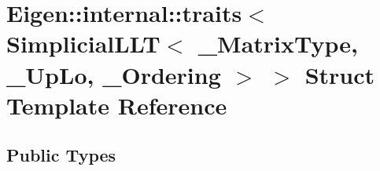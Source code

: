 \hypertarget{struct_eigen_1_1internal_1_1traits_3_01_simplicial_l_l_t_3_01___matrix_type_00_01___up_lo_00_01___ordering_01_4_01_4}{}\section{Eigen\+::internal\+::traits$<$ Simplicial\+L\+LT$<$ \+\_\+\+Matrix\+Type, \+\_\+\+Up\+Lo, \+\_\+\+Ordering $>$ $>$ Struct Template Reference}
\label{struct_eigen_1_1internal_1_1traits_3_01_simplicial_l_l_t_3_01___matrix_type_00_01___up_lo_00_01___ordering_01_4_01_4}
\subsection*{Public Types}
